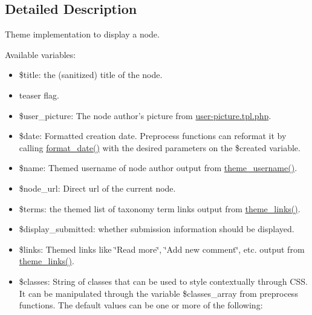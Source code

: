\subsection{Detailed Description}
Theme implementation to display a node.

Available variables:\begin{itemize}
\item \$title: the (sanitized) title of the node.\item {}
teaser flag.\item \$user\_\-picture: The node author's picture from \hyperlink{user-picture_8tpl_8php}{user-picture.tpl.php}.\item \$date: Formatted creation date. Preprocess functions can reformat it by calling \hyperlink{group__format_g40553742a67f9c79c4669b9053fe202c}{format\_\-date()} with the desired parameters on the \$created variable.\item \$name: Themed username of node author output from \hyperlink{group__themeable_gf08895a75b95547417a302272e0b027c}{theme\_\-username()}.\item \$node\_\-url: Direct url of the current node.\item \$terms: the themed list of taxonomy term links output from \hyperlink{group__themeable_g6a23e012993ee8a2494249148d15d2bf}{theme\_\-links()}.\item \$display\_\-submitted: whether submission information should be displayed.\item \$links: Themed links like \char`\"{}Read more\char`\"{}, \char`\"{}Add new comment\char`\"{}, etc. output from \hyperlink{group__themeable_g6a23e012993ee8a2494249148d15d2bf}{theme\_\-links()}.\item \$classes: String of classes that can be used to style contextually through CSS. It can be manipulated through the variable \$classes\_\-array from preprocess functions. The default values can be one or more of the following:\begin{itemize}

\end{itemize}
\end{itemize}
